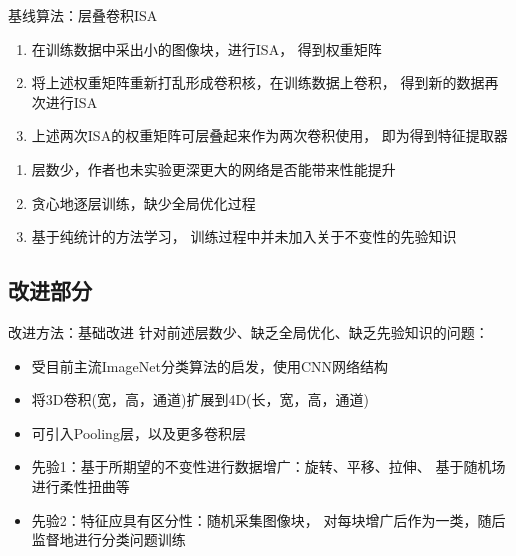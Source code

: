 \documentclass {beamer}
\begin{document}
\begin{frame}{基线算法：层叠卷积ISA\cite{le2011learning,wu2013unsupervised}}
    \begin{description}
        \item[概述]
            \begin{enumerate}
                \item 在训练数据中采出小的图像块，进行ISA，
                    得到权重矩阵
                \item 将上述权重矩阵重新打乱形成卷积核，在训练数据上卷积，
                    得到新的数据再次进行ISA
                \item 上述两次ISA的权重矩阵可层叠起来作为两次卷积使用，
                    即为得到特征提取器
            \end{enumerate}
        \item<2>[问题]
            \begin{enumerate}
                \item 层数少，作者也未实验更深更大的网络是否能带来性能提升
                \item 贪心地逐层训练，缺少全局优化过程
                \item 基于纯统计的方法学习，
                    训练过程中并未加入关于不变性的先验知识
            \end{enumerate}
    \end{description}
\end{frame}


\subsection{改进部分}

\begin{frame}{改进方法：基础改进}
    针对前述层数少、缺乏全局优化、缺乏先验知识的问题：
    \pause
    \begin{itemize}
        \item<+-> 受目前主流ImageNet分类算法的启发，使用CNN网络结构
        \item<+-> 将3D卷积(宽，高，通道)扩展到4D(长，宽，高，通道)
        \item<+-> 可引入Pooling层，以及更多卷积层
        \item<+-> 先验1：基于所期望的不变性进行数据增广：旋转、平移、拉伸、
            基于随机场进行柔性扭曲等
        \item<+-> 先验2：特征应具有区分性：随机采集图像块，
            对每块增广后作为一类，随后监督地进行分类问题训练
    \end{itemize}
\end{frame}
\end{document}
